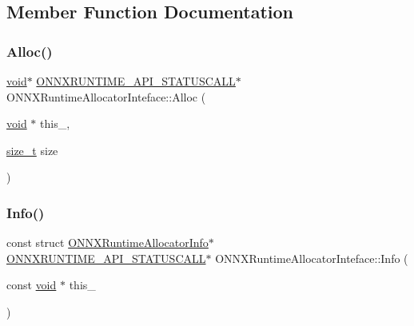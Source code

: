 \subsection{Member Function Documentation}
\mbox{\label{structONNXRuntimeAllocatorInteface_a87c198fd69b56c2623890b82ec888446}} 
\subsubsection{\texorpdfstring{Alloc()}{Alloc()}}
{\footnotesize\ttfamily \mbox{\hyperlink{structONNXRuntimeAllocatorInteface_a54eabf966f0201ca7ad1be93fcf5f133}{void}}$\ast$ \mbox{\hyperlink{error__code_8h_aeaeecdc9b792735c3e26fc0f9815c988}{O\+N\+N\+X\+R\+U\+N\+T\+I\+M\+E\+\_\+\+A\+P\+I\+\_\+\+S\+T\+A\+T\+U\+S\+C\+A\+LL}}$\ast$ O\+N\+N\+X\+Runtime\+Allocator\+Inteface\+::\+Alloc (\begin{DoxyParamCaption}\item[{\mbox{\hyperlink{structONNXRuntimeAllocatorInteface_a54eabf966f0201ca7ad1be93fcf5f133}{void}} $\ast$}]{this\+\_\+,  }\item[{\mbox{\hyperlink{mlasi_8h_a503efbc1c6e50825320ad909366b78ab}{size\+\_\+t}}}]{size }\end{DoxyParamCaption})}

\mbox{\label{structONNXRuntimeAllocatorInteface_abec6c9a075d52bd7146cfab9c64b184e}} 
\subsubsection{\texorpdfstring{Info()}{Info()}}
{\footnotesize\ttfamily const struct \mbox{\hyperlink{structONNXRuntimeAllocatorInfo}{O\+N\+N\+X\+Runtime\+Allocator\+Info}}$\ast$ \mbox{\hyperlink{error__code_8h_aeaeecdc9b792735c3e26fc0f9815c988}{O\+N\+N\+X\+R\+U\+N\+T\+I\+M\+E\+\_\+\+A\+P\+I\+\_\+\+S\+T\+A\+T\+U\+S\+C\+A\+LL}}$\ast$ O\+N\+N\+X\+Runtime\+Allocator\+Inteface\+::\+Info (\begin{DoxyParamCaption}\item[{const \mbox{\hyperlink{structONNXRuntimeAllocatorInteface_a54eabf966f0201ca7ad1be93fcf5f133}{void}} $\ast$}]{this\+\_\+ }\end{DoxyParamCaption})}

